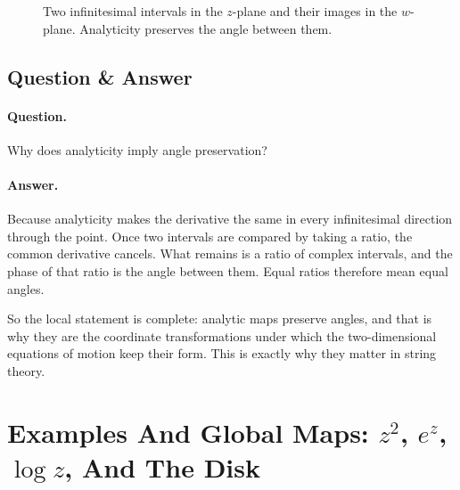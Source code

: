\begin{figure}[h]
\centering
{}
\caption{Two infinitesimal intervals in the \(z\)-plane and their images in the \(w\)-plane. Analyticity preserves the angle between them.}
\end{figure}

\subsection{Question \& Answer}

\paragraph{Question.} Why does analyticity imply angle preservation?

\paragraph{Answer.} Because analyticity makes the derivative the same in every infinitesimal direction through the point. Once two intervals are compared by taking a ratio, the common derivative cancels. What remains is a ratio of complex intervals, and the phase of that ratio is the angle between them. Equal ratios therefore mean equal angles.

So the local statement is complete: analytic maps preserve angles, and that is why they are the coordinate transformations under which the two-dimensional equations of motion keep their form. This is exactly why they matter in string theory.

\section{Examples And Global Maps: \(z^2\), \(e^z\), \(\log z\), And The Disk}

